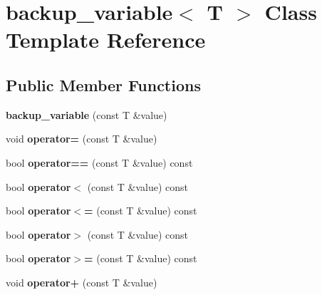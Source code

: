 \hypertarget{classbackup__variable}{\section{backup\+\_\+variable$<$ T $>$ Class Template Reference}
\label{classbackup__variable}
}
\subsection*{Public Member Functions}
\begin{DoxyCompactItemize}
\item 
\hypertarget{classbackup__variable_a5ffb4ce0ce0f679135ce70d8683a9182}{{\bfseries backup\+\_\+variable} (const T \&value)}\label{classbackup__variable_a5ffb4ce0ce0f679135ce70d8683a9182}

\item 
\hypertarget{classbackup__variable_ae4c8c3147d8a341eb268f7b2332098d6}{void {\bfseries operator=} (const T \&value)}\label{classbackup__variable_ae4c8c3147d8a341eb268f7b2332098d6}

\item 
\hypertarget{classbackup__variable_aec3207431e35f74efa6fe2af77ec734d}{bool {\bfseries operator==} (const T \&value) const }\label{classbackup__variable_aec3207431e35f74efa6fe2af77ec734d}

\item 
\hypertarget{classbackup__variable_af6d27d4c48c46816a5f82343609b24db}{bool {\bfseries operator$<$} (const T \&value) const }\label{classbackup__variable_af6d27d4c48c46816a5f82343609b24db}

\item 
\hypertarget{classbackup__variable_a60de5d54f02e5d862ae851ab773830db}{bool {\bfseries operator$<$=} (const T \&value) const }\label{classbackup__variable_a60de5d54f02e5d862ae851ab773830db}

\item 
\hypertarget{classbackup__variable_a1956d30f9a5124527ac9d52821ce9d72}{bool {\bfseries operator$>$} (const T \&value) const }\label{classbackup__variable_a1956d30f9a5124527ac9d52821ce9d72}

\item 
\hypertarget{classbackup__variable_a0b749c6e3c84c43d094d1ba50d1a2323}{bool {\bfseries operator$>$=} (const T \&value) const }\label{classbackup__variable_a0b749c6e3c84c43d094d1ba50d1a2323}

\item 
\hypertarget{classbackup__variable_a1ae3f1fcce3725da51aab2879c523a09}{void {\bfseries operator+} (const T \&value)}\label{classbackup__variable_a1ae3f1fcce3725da51aab2879c523a09}


\end{DoxyCompactItemize}
